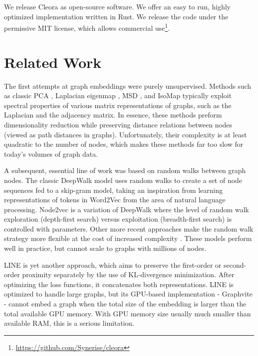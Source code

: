 \documentclass{IEEEtran}
\begin{document}
We release Cleora as open-source software. We offer an easy to run, highly optimized implementation written in Rust. We release the code under the permissive MIT license, which allows commercial use\footnote{\url{https://github.com/Synerise/cleora}}.

\section{Related Work}
\label{related-work}

The first attempts at graph embeddings were purely unsupervised. Methods such as classic PCA \cite{Jolliffe1986}, Laplacian eigenmap \cite{NIPS2001_1961}, MSD \cite{cox2000multidimensional}, and IsoMap \cite{tenenbaum_global_2000} typically exploit spectral properties of various matrix representations of graphs, such as the Laplacian and the adjacency matrix. In essence, these methods preform dimensionality reduction while preserving distance relations between nodes (viewed as path distances in graphs). Unfortunately, their complexity is at least quadratic to the number of nodes, which makes these methods far too slow for today's volumes of graph data. 

A subsequent, essential line of work was based on random walks between graph nodes. The classic DeepWalk model \cite{perozzi2014deepwalk} uses random walks to create a set of node sequences fed to a skip-gram model, taking an inspiration from learning representations of tokens in Word2Vec \cite{Word2Vec} from the area of natural language processing. Node2vec \cite{grover2016node2vec} is a variation of DeepWalk where the level of random walk exploration (depth-first search) versus exploitation (breadth-first search) is controlled with parameters. Other more recent approaches make the random walk strategy more flexible at the cost of increased complexity \cite{harp, 10.1145/3110025.3110086}. These models perform well in practice, but cannot scale to graphs with millions of nodes.  

LINE \cite{10.1145/2736277.2741093} is yet another approach, which aims to preserve the first-order or second-order proximity separately by the use of KL-divergence minimization.  After optimizing the loss functions, it concatenates both representations. LINE is optimized to handle large graphs, but its GPU-based  implementation - Graphvite \cite{Zhu2019GraphViteAH} - cannot embed a graph when the total size of the embedding is larger than the total available GPU memory. With GPU memory size usually much smaller than available RAM, this is a serious limitation.
\end{document}

